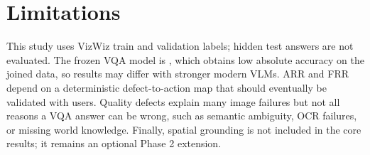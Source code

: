 \section{Limitations}

This study uses VizWiz train and validation labels; hidden test answers are not evaluated. The frozen VQA model is \vilt, which obtains low absolute accuracy on the joined data, so results may differ with stronger modern VLMs. ARR and FRR depend on a deterministic defect-to-action map that should eventually be validated with users. Quality defects explain many image failures but not all reasons a VQA answer can be wrong, such as semantic ambiguity, OCR failures, or missing world knowledge. Finally, spatial grounding is not included in the core results; it remains an optional Phase 2 extension.
